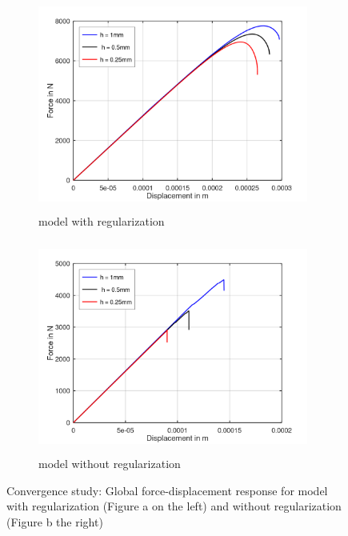 \documentclass[12pt,a4paper,twoside,openright]{report}
\begin{document}
\begin{figure}[htbp!]
     \captionsetup[subfigure]{justification=centering}
     \begin{subfigure}{0.45\textwidth}
         \includegraphics[width=8.9cm,height=7cm]{25.FvsD.png}
         \caption{model with regularization}
         \label{fig:with regularization}
     \end{subfigure}
     \hspace{1.5cm}
     \begin{subfigure}{0.45\textwidth}
         \includegraphics[width=8.9cm,height=7cm]{25.FvsD2.png}
         \caption{model without regularization}
         \label{fig:without regularization}
     \end{subfigure}
    \caption{Convergence study: Global force-displacement response for model with regularization (Figure a on the left) and without regularization (Figure b the right) }
    \label{fig:Convergence study}
\end{figure}
\FloatBarrier
 
\end{document}
